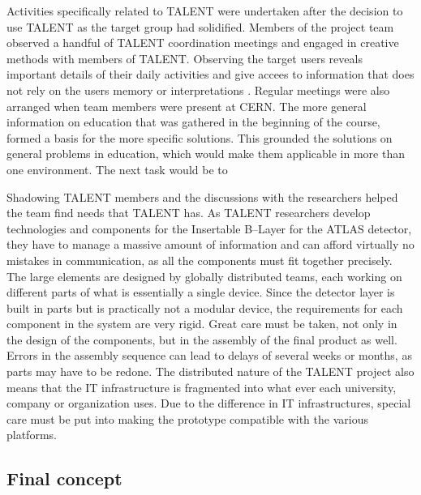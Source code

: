 \documentclass[english,12pt,a4paper,dvips]{article}
\begin{document}
Activities specifically related to TALENT were undertaken after the decision to use TALENT as the target group had solidified. Members of the project team observed a handful of TALENT coordination meetings and engaged in creative methods with members of TALENT. Observing the target users reveals important details of their daily activities and give accees to information that does not rely on the users memory or interpretations \cite{Patnaik}. Regular meetings were also arranged when team members were present at CERN. The more general information on education that was gathered in the beginning of the course, formed a basis for the more specific solutions. This grounded the solutions on general problems in education, which would make them applicable in more than one environment. The next task would be to 

Shadowing TALENT members and the discussions with the researchers helped the team find needs that TALENT has. As TALENT researchers develop technologies and components for the Insertable B--Layer for the ATLAS detector, they have to manage a massive amount of information and can afford virtually no mistakes in communication, as all the components must fit together precisely. The large elements are designed by globally distributed teams, each working on different parts of what is essentially a single device. Since the detector layer is built in parts but is practically not a modular device, the requirements for each component in the system are very rigid. Great care must be taken, not only in the design of the components, but in the assembly of the final product as well. Errors in the assembly sequence can lead to delays of several weeks or months, as parts may have to be redone. The distributed nature of the TALENT project also means that the IT infrastructure is fragmented into what ever each university, company or organization uses. Due to the difference in IT infrastructures, special care must be put into making the prototype compatible with the various platforms. 



\subsection{Final concept}

\end{document}
